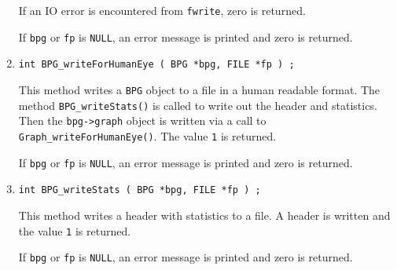 \begin{enumerate}
If an IO error is encountered from {\tt fwrite}, zero is returned.
\par {}
If {\tt bpg} or {\tt fp} is {\tt NULL},
an error message is printed and zero is returned.
\item
\begin{verbatim}
int BPG_writeForHumanEye ( BPG *bpg, FILE *fp ) ;
\end{verbatim}
\par
This method writes a {\tt BPG} object to a file
in a human readable format.
The method {\tt BPG\_writeStats()} 
is called to write out the
header and statistics. 
Then the {\tt bpg->graph} object is written via a call to
{\tt Graph\_writeForHumanEye()}.
The value {\tt 1} is returned.
\par {}
If {\tt bpg} or {\tt fp} is {\tt NULL},
an error message is printed and zero is returned.
\item
\begin{verbatim}
int BPG_writeStats ( BPG *bpg, FILE *fp ) ;
\end{verbatim}
\par
This method writes a header with statistics to a file.
A header is written and the value {\tt 1} is returned.
\par {}
If {\tt bpg} or {\tt fp} is {\tt NULL},
an error message is printed and zero is returned.
\end{enumerate}
